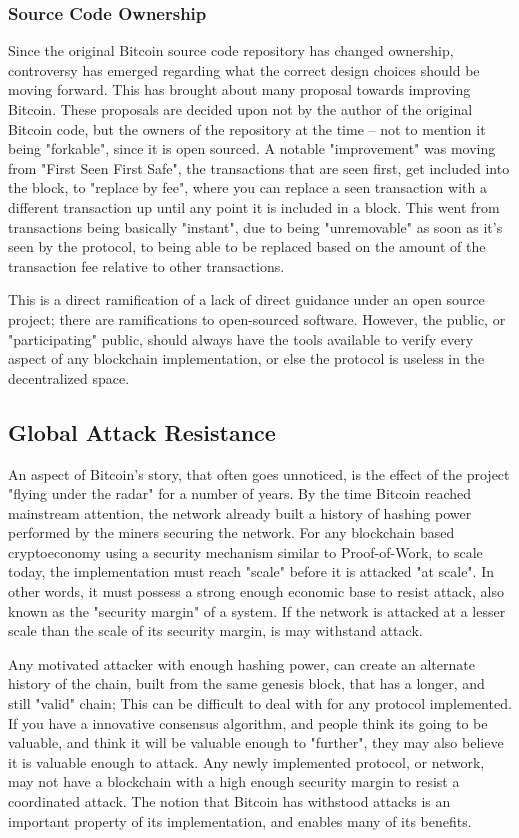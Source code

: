 \documentclass[12pt, titlepage, twocolumn]{report}
\begin{document}
\subsubsection{Source Code Ownership}
Since the original Bitcoin source code repository has changed ownership, controversy has emerged regarding what the correct design choices should be moving forward. This has brought about many proposal towards improving Bitcoin. These proposals are decided upon not by the author of the original Bitcoin code, but the owners of the repository at the time -- not to mention it being "forkable", since it is open sourced. A notable "improvement" was moving from "First Seen First Safe", the transactions that are seen first, get included into the block, to "replace by fee", where you can replace a seen transaction with a different transaction up until any point it is included in a block. This went from transactions being basically "instant", due to being "unremovable" as soon as it's seen by the protocol, to being able to be replaced based on the amount of the transaction fee relative to other transactions.

This is a direct ramification of a lack of direct guidance under an open source project; there are ramifications to open-sourced software. However, the public, or "participating" public, should always have the tools available to verify every aspect of any blockchain implementation, or else the protocol is useless in the decentralized space.


\subsection{Global Attack Resistance}
An aspect of Bitcoin's story, that often goes unnoticed, is the effect of the project "flying under the radar" for a number of years. By the time Bitcoin reached mainstream attention, the network already built a history of hashing power performed by the miners securing the network. For any blockchain based cryptoeconomy using a security mechanism similar to Proof-of-Work, to scale today, the implementation must reach "scale" before it is attacked "at scale". In other words, it must possess a strong enough economic base to resist attack, also known as the "security margin" of a system. If the network is attacked at a lesser scale than the scale of its security margin, is may withstand attack.

Any motivated attacker with enough hashing power, can create an alternate history of the chain, built from the same genesis block, that has a longer, and still "valid" chain; This can be difficult to deal with for any protocol implemented. If you have a innovative consensus algorithm, and people think its going to be valuable, and think it will be valuable enough to "further", they may also believe it is valuable enough to attack. Any newly implemented protocol, or network, may not have a blockchain with a high enough security margin to resist a coordinated attack. The notion that Bitcoin has withstood attacks is an important property of its implementation, and enables many of its benefits.
\end{document}
